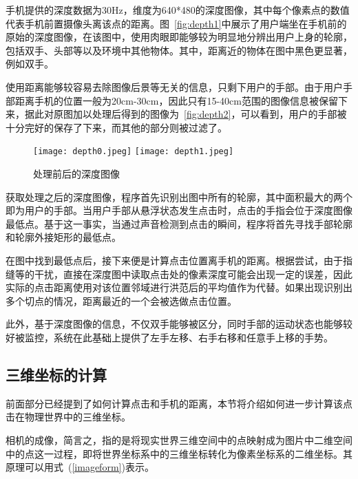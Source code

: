 手机提供的深度数据为30Hz，维度为640*480的深度图像，其中每个像素点的数值代表手机前置摄像头离该点的距离。图~\ref{fig:depth1}中展示了用户端坐在手机前的原始的深度图像，在该图中，使用肉眼即能够较为明显地分辨出用户上身的轮廓，包括双手、头部等以及环境中其他物体。其中，距离近的物体在图中黑色更显著，例如双手。

使用距离能够较容易去除图像后景等无关的信息，只剩下用户的手部。由于用户手部距离手机的位置一般为20cm-30cm，因此只有15-40cm范围的图像信息被保留下来，据此对原图加以处理后得到的图像为~\ref{fig:depth2}，可以看到，用户的手部被十分完好的保存了下来，而其他的部分则被过滤了。
\begin{figure}[h]
  \centering%
    {\texttt{[image: depth0.jpeg]}}%
  \hspace{4em}%
      {\texttt{[image: depth1.jpeg]}}
  \caption{处理前后的深度图像}
  \label{fig:depth-image}
\end{figure}

获取处理之后的深度图像，程序首先识别出图中所有的轮廓，其中面积最大的两个即为用户的手部。当用户手部从悬浮状态发生点击时，点击的手指会位于深度图像最低点。基于这一事实，当通过声音检测到点击的瞬间，程序将首先寻找手部轮廓和轮廓外接矩形的最低点。

在图中找到最低点后，接下来便是计算点击位置离手机的距离。根据尝试，由于指缝等的干扰，直接在深度图中读取点击处的像素深度可能会出现一定的误差，因此实际的点击距离使用对该位置邻域进行洪范后的平均值作为代替。如果出现识别出多个切点的情况，距离最近的一个会被选做点击位置。

此外，基于深度图像的信息，不仅双手能够被区分，同时手部的运动状态也能够较好被监控，系统在此基础上提供了左手左移、右手右移和任意手上移的手势。

\subsection{三维坐标的计算}
前面部分已经提到了如何计算点击和手机的距离，本节将介绍如何进一步计算该点击在物理世界中的三维坐标。

相机的成像，简言之，指的是将现实世界三维空间中的点映射成为图片中二维空间中的点这一过程，即将世界坐标系中的三维坐标转化为像素坐标系的二维坐标。其原理可以用式~(\ref{imageform})表示。

